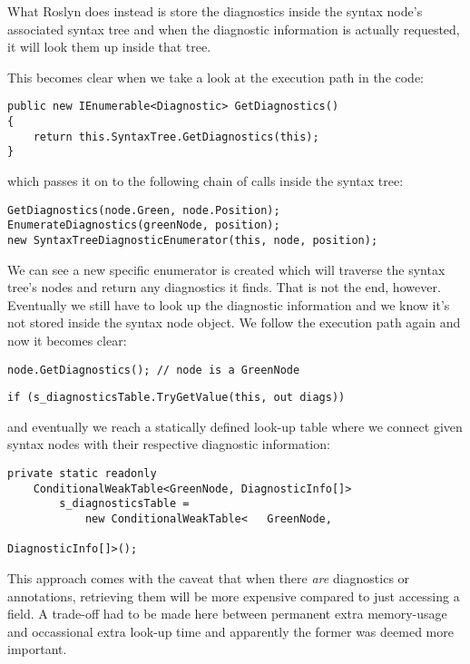 What Roslyn does instead is store the diagnostics inside the syntax node's associated syntax tree and when the diagnostic information is actually requested, it will look them up inside that tree.

\noindent This becomes clear when we take a look at the execution path in the code:

\begin{lstlisting}
public new IEnumerable<Diagnostic> GetDiagnostics()
{
	return this.SyntaxTree.GetDiagnostics(this);
}
\end{lstlisting}

\noindent which passes it on to the following chain of calls inside the syntax tree:

\begin{lstlisting}
GetDiagnostics(node.Green, node.Position);
EnumerateDiagnostics(greenNode, position);
new SyntaxTreeDiagnosticEnumerator(this, node, position);
\end{lstlisting}

\noindent We can see a new specific enumerator is created which will traverse the syntax tree's nodes and return any diagnostics it finds. That is not the end, however. Eventually we still have to look up the diagnostic information and we know it's not stored inside the syntax node object. We follow the execution path again and now it becomes clear:

\begin{lstlisting}
node.GetDiagnostics(); // node is a GreenNode
\end{lstlisting}

\begin{lstlisting}
if (s_diagnosticsTable.TryGetValue(this, out diags))
\end{lstlisting}

\noindent and eventually we reach a statically defined look-up table where we connect given syntax nodes with their respective diagnostic information:

\begin{lstlisting}
private static readonly 
	ConditionalWeakTable<GreenNode, DiagnosticInfo[]> 
		s_diagnosticsTable =
			new ConditionalWeakTable<	GreenNode, 
																DiagnosticInfo[]>();
\end{lstlisting}

This approach comes with the caveat that when there \textit{are} diagnostics or annotations, retrieving them will be more expensive compared to just accessing a field. A trade-off had to be made here between permanent extra memory-usage and occassional extra look-up time and apparently the former was deemed more important.
